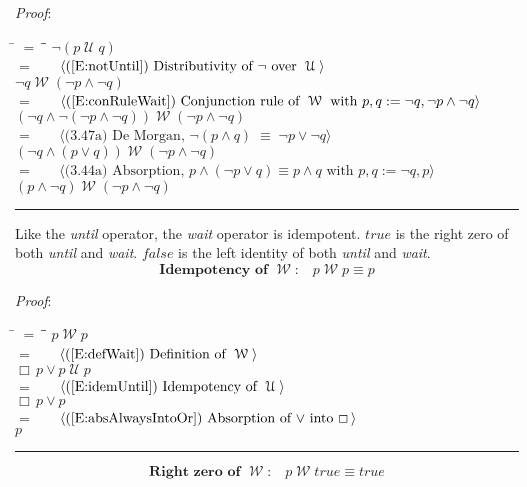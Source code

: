 \documentclass[12pt, fleqn, leqno]{article}
\newcommand{\lgap}{2pt}                             %
\newcommand{\mymathindent}{24pt}                    %
\newcommand{\equivs}{\ensuremath{\;\equiv\;}}       %
\newcommand{\Until}{\;\mathcal{U}\;}
\newcommand{\Wait}{\;\mathcal{W}\;}
\newcommand{\Always}{\Box\,}
\newcommand{\myqed}{\rule[-.23ex]{1.2ex}{2.0ex}}
\newcommand{\myqedtab}{\hspace{384pt}}              %
\newcommand{\Gll} {\langle}                         %
\newcommand{\Ggg} {\rangle}                         %
\newcommand{\Hint}[1]     {\ \ \ $\Gll              \mbox{#1} \Ggg$ }   %
\begin{document}
\emph{Proof}:
\begin{tabbing}
\hspace{\mymathindent} \= $= \;$ \= \myqedtab \= \kill
\> \> $\neg (p\Until q)$\\[\lgap]
\> $=$ \> \Hint{(\ref{E:notUntil}) Distributivity of $\neg$ over $\Until$} \\[\lgap]
\> \> $\neg q \Wait (\neg p \land \neg q)$\\[\lgap]
\> $=$ \> \Hint{(\ref{E:conRuleWait}) Conjunction rule of $\Wait$ with $p,q:=\neg q, \neg p\land\neg q$} \\[\lgap]
\> \> $(\neg q \land \neg(\neg p \land \neg q)) \Wait (\neg p \land \neg q)$\\[\lgap]
\> $=$  \>  \Hint{(3.47a) De Morgan, $\neg(p\land q)\equivs \neg p\lor\neg q$}\\[\lgap]
\> \> $(\neg q \land (p \lor q)) \Wait (\neg p \land \neg q)$\\[\lgap]
\> $=$ \> \Hint{(3.44a) Absorption, $p\land (\neg p\lor q)\equiv p\land q$ with $p,q:=\neg q,p$} \\[\lgap]
\> \> $(p \land \neg q) \Wait (\neg p \land \neg q)$ \quad \myqed
\end{tabbing}

Like the \textit{until} operator, the \textit{wait} operator is idempotent.
$true$ is the right zero of both \textit{until} and \textit{wait}.
$false$ is the left identity of both \textit{until} and \textit{wait}.
\begin{equation}\label{E:idempWait}
\textbf{Idempotency of $\Wait$:}\quad p \Wait p \equiv p
\end{equation}

\emph{Proof}:
\begin{tabbing}
\hspace{\mymathindent} \= $= \;$ \= \myqedtab \= \kill
\> \> $p \Wait p$\\[\lgap]
\> $=$ \> \Hint{(\ref{E:defWait}) Definition of $\Wait$} \\[\lgap]
\> \> $\Always p \lor p\Until p$\\[\lgap]
\> $=$ \> \Hint{(\ref{E:idemUntil}) Idempotency of $\Until$} \\[\lgap]
\> \> $\Always p \lor p$\\[\lgap]
\> $=$ \> \Hint{(\ref{E:absAlwaysIntoOr}) Absorption of $\lor$ into $\Always$}\\[\lgap]
\> \> $p$ \quad \myqed
\end{tabbing}
\begin{equation}\label{E:rightZeroWait}
\textbf{Right zero of $\Wait$:}\quad p \Wait true \equiv true
\end{equation}
\end{document}
